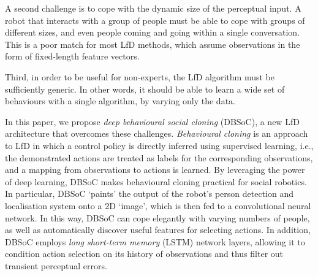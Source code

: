\documentclass[letterpaper, 10 pt, conference]{ieeeconf}
\begin{document}
A second challenge is to cope with the dynamic size of the perceptual input.  A robot that interacts with a group of people must be able to cope with groups of different sizes, and even people coming and going within a single conversation.  This is a poor match for most LfD methods, which assume observations in the form of fixed-length feature vectors.

Third, in order to be useful for non-experts, the LfD algorithm must be sufficiently generic. In other words, it should be able to learn a wide set of behaviours with a single algorithm, by varying only the data. 



In this paper, we propose \emph{deep behavioural social cloning} (DBSoC), a new LfD architecture that overcomes these challenges.  \emph{Behavioural cloning} is an approach to LfD in which a control policy is directly inferred using supervised learning, i.e., the demonstrated actions are treated as labels for the corresponding observations, and a mapping from observations to actions is learned.  By leveraging the power of deep learning, DBSoC makes behavioural cloning practical for social robotics.  In particular, DBSoC `paints' the output of the robot's person detection and localisation system onto a 2D `image', which is then fed to a convolutional neural network.  In this way, DBSoC can cope elegantly with varying numbers of people, as well as automatically discover useful features for selecting actions.  In addition, DBSoC employs \emph{long short-term memory} (LSTM) network layers, allowing it to condition action selection on its history of observations and thus filter out transient perceptual errors.
\end{document}
